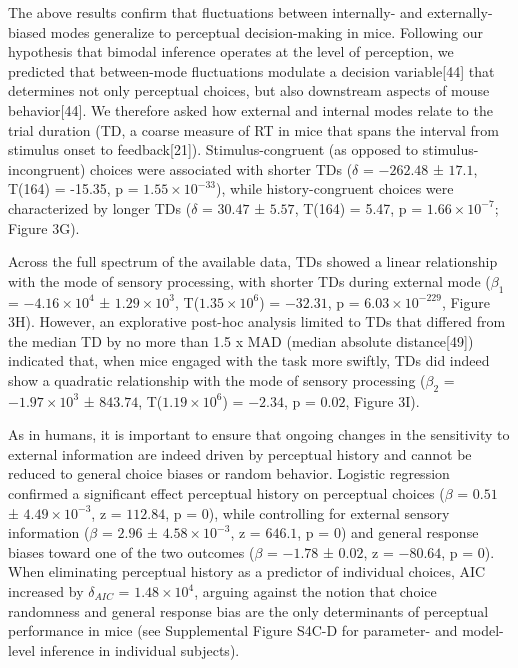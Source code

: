 \documentclass[
]{article}
\begin{document}
The above results confirm that fluctuations between internally- and
externally-biased modes generalize to perceptual decision-making in
mice. Following our hypothesis that bimodal inference operates at the
level of perception, we predicted that between-mode fluctuations
modulate a decision variable{[}44{]} that determines not only perceptual
choices, but also downstream aspects of mouse behavior{[}44{]}. We
therefore asked how external and internal modes relate to the trial
duration (TD, a coarse measure of RT in mice that spans the interval
from stimulus onset to feedback{[}21{]}). Stimulus-congruent (as opposed
to stimulus-incongruent) choices were associated with shorter TDs
(\(\delta\) = \(-262.48\) ± \(17.1\), T(164) = -15.35, p =
\(\ensuremath{1.55\times 10^{-33}}\)), while history-congruent choices
were characterized by longer TDs (\(\delta\) = \(30.47\) ± \(5.57\),
T(164) = 5.47, p = \(\ensuremath{1.66\times 10^{-7}}\); Figure 3G).

Across the full spectrum of the available data, TDs showed a linear
relationship with the mode of sensory processing, with shorter TDs
during external mode (\(\beta_1\) = \(\ensuremath{-4.16\times 10^{4}}\)
± \(\ensuremath{1.29\times 10^{3}}\),
T(\(\ensuremath{1.35\times 10^{6}}\)) = \(-32.31\), p =
\(\ensuremath{6.03\times 10^{-229}}\), Figure 3H). However, an
explorative post-hoc analysis limited to TDs that differed from the
median TD by no more than 1.5 x MAD (median absolute distance{[}49{]})
indicated that, when mice engaged with the task more swiftly, TDs did
indeed show a quadratic relationship with the mode of sensory processing
(\(\beta_2\) = \(\ensuremath{-1.97\times 10^{3}}\) ± \(843.74\),
T(\(\ensuremath{1.19\times 10^{6}}\)) = \(-2.34\), p = \(0.02\), Figure
3I).

As in humans, it is important to ensure that ongoing changes in the
sensitivity to external information are indeed driven by perceptual
history and cannot be reduced to general choice biases or random
behavior. Logistic regression confirmed a significant effect perceptual
history on perceptual choices (\(\beta\) = \(0.51\) ±
\(\ensuremath{4.49\times 10^{-3}}\), z = \(112.84\), p = \(0\)), while
controlling for external sensory information (\(\beta\) = \(2.96\) ±
\(\ensuremath{4.58\times 10^{-3}}\), z = \(646.1\), p = \(0\)) and
general response biases toward one of the two outcomes (\(\beta\) =
\(-1.78\) ± \(0.02\), z = \(-80.64\), p = \(0\)). When eliminating
perceptual history as a predictor of individual choices, AIC increased
by \(\delta_{AIC}\) = \(\ensuremath{1.48\times 10^{4}}\), arguing
against the notion that choice randomness and general response bias are
the only determinants of perceptual performance in mice (see
Supplemental Figure S4C-D for parameter- and model-level inference in
individual subjects).
\end{document}
